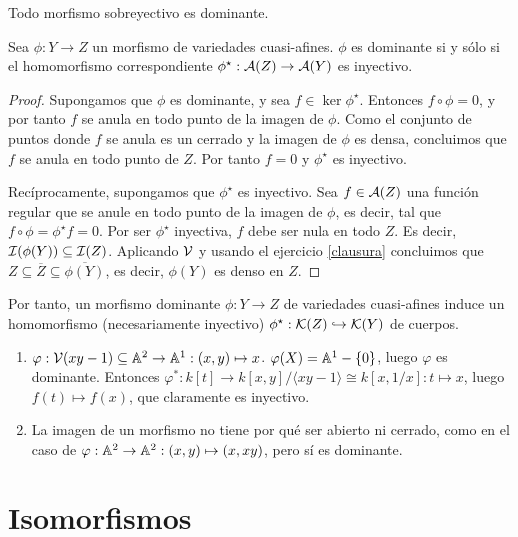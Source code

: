 \documentclass[ACGA.tex]{subfiles}
\begin{document}
\begin{nota}
Todo morfismo sobreyectivo es dominante.
\end{nota}

\begin{prop}\label{dominanteinyectivo}
 Sea $\phi:Y\to Z$ un morfismo de variedades cuasi-afines. $\phi$ es dominante si y sólo si el homomorfismo correspondiente $\phi^\star:\mathcal{A}(Z)\to\mathcal{A}(Y)$ es inyectivo.
\end{prop}

\begin{proof}
 Supongamos que $\phi$ es dominante, y sea $f\in\ker\phi^\star$. Entonces $f\circ\phi=0$, y por tanto $f$ se anula en todo punto de la imagen de $\phi$. Como el conjunto de puntos donde $f$ se anula es un cerrado y la imagen de $\phi$ es densa, concluimos que $f$ se anula en todo punto de $Z$. Por tanto $f=0$ y $\phi^\star$ es inyectivo.

Recíprocamente, supongamos que $\phi^\star$ es inyectivo. Sea $f\in\mathcal{A}(Z)$ una función regular que se anule en todo punto de la imagen de $\phi$, es decir, tal que $f\circ\phi=\phi^\star f=0$. Por ser $\phi^\star$ inyectiva, $f$ debe ser nula en todo $Z$. Es decir, $\mathcal{I}(\phi(Y))\subseteq\mathcal{I}(Z)$. Aplicando $\mathcal{V}$ y usando el ejercicio \ref{clausura} concluimos que $Z\subseteq\overline Z\subseteq\overline{\phi(Y)}$, es decir, $\phi(Y)$ es denso en $Z$. 
\end{proof}

Por tanto, un morfismo dominante $\phi:Y\to Z$ de variedades cuasi-afines induce un homomorfismo (necesariamente inyectivo) $\phi^\star:{\mathcal K}(Z)\hookrightarrow{\mathcal K}(Y)$ de cuerpos.

\begin{ejs}
\begin{enumerate}


\item $\varphi: \mathcal{V}(xy-1)\subseteq\mathbb{A}^2\to\mathbb{A}^1: (x,y)\mapsto x$. $\varphi(X)=\mathbb{A}^1-\{0\}$, luego $\varphi$ es dominante. Entonces $\varphi^*:k[t]\to k[x,y]/\langle xy-1\rangle\cong k[x,1/x]: t\mapsto x$, luego $f(t)\mapsto f(x)$, que claramente es inyectivo. 

\item La imagen de un morfismo no tiene por qué ser abierto ni cerrado, como en el caso de $\varphi:\mathbb{A}^2\to\mathbb{A}^2: (x,y)\mapsto (x,xy)$, pero sí es dominante.
\end{enumerate}
\end{ejs}

\section{Isomorfismos}
\end{document}
